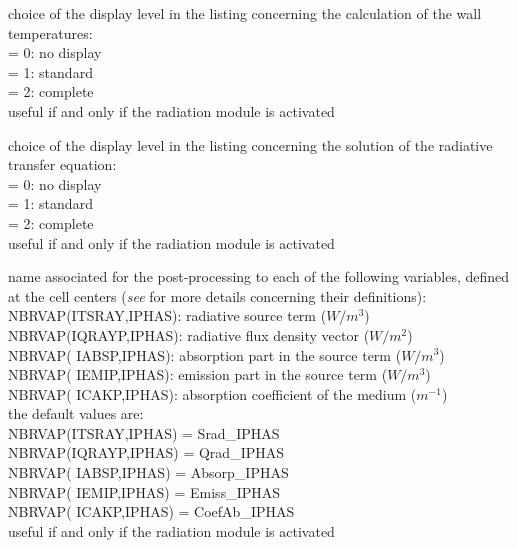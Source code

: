 {choice of the display level in the listing concerning the calculation of
the wall temperatures:\\
\hspace*{1.3cm}= 0: no display\\
\hspace*{1.3cm}= 1: standard\\
\hspace*{1.3cm}= 2: complete\\
useful if and only if the radiation module is activated}

{choice of the display level in the listing concerning the solution of
the radiative transfer equation:\\
\hspace*{1.3cm}= 0: no display\\
\hspace*{1.3cm}= 1: standard\\
\hspace*{1.3cm}= 2: complete\\
useful if and only if the radiation module is activated}

{name associated for the post-processing to each of the following variables,
defined at the cell centers ({\it see}
\cite{Douce02} for more details concerning their definitions):\\ 
\hspace*{1.3cm} NBRVAP(ITSRAY,IPHAS): radiative source term ($W/m^3$)\\
\hspace*{1.3cm} NBRVAP(IQRAYP,IPHAS): radiative flux density vector ($W/m^2$)\\
\hspace*{1.3cm} NBRVAP( IABSP,IPHAS): absorption part in the source term
($W/m^3$)\\ 
\hspace*{1.3cm} NBRVAP( IEMIP,IPHAS): emission part in the source term
($W/m^3$)\\ 
\hspace*{1.3cm} NBRVAP( ICAKP,IPHAS): absorption coefficient of the
medium ($m^{-1}$)\\ 
the default values are: \\
\hspace*{1.3cm} NBRVAP(ITSRAY,IPHAS) = Srad\_IPHAS \\
\hspace*{1.3cm} NBRVAP(IQRAYP,IPHAS) = Qrad\_IPHAS \\
\hspace*{1.3cm} NBRVAP( IABSP,IPHAS) = Absorp\_IPHAS \\
\hspace*{1.3cm} NBRVAP( IEMIP,IPHAS) = Emiss\_IPHAS \\
\hspace*{1.3cm} NBRVAP( ICAKP,IPHAS) = CoefAb\_IPHAS \\
useful if and only if the radiation module is activated}

